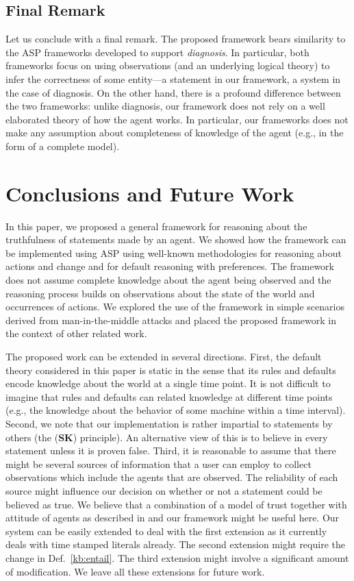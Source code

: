 \documentclass{article}
\begin{document}

\subsection{Final Remark}
Let us conclude with a final remark. 
 The proposed framework bears  similarity  to the ASP frameworks developed to
 support \emph{diagnosis}. In particular, both frameworks  focus on using observations (and an underlying logical theory) to infer the correctness of some entity---a statement in our framework, a system in the case of diagnosis. 
 On the other hand, there is a profound difference between the two frameworks: unlike diagnosis, our 
 framework does  not rely on  a well elaborated theory of how the agent works. In particular, our frameworks 
 does not make any assumption about completeness of knowledge of the agent (e.g., in the form of a complete
 model).
  \fi 
   
 \section{Conclusions and Future Work}
In this paper, we proposed a general framework for reasoning about the truthfulness of statements
made by an agent. We showed how the framework can be implemented using ASP using well-known methodologies for reasoning about actions and change and for default reasoning with preferences. The framework does not assume complete knowledge about the agent being observed and the reasoning 
process builds on observations about the state of the world and occurrences of actions. We explored the use of the
framework in simple scenarios derived from man-in-the-middle attacks and  placed the proposed framework in the context of other related work.


The proposed work can be extended in several directions. First, the default theory considered in this paper is static in the sense that its rules and defaults encode knowledge about the world at a single time point. It is not difficult to imagine that rules and defaults can related knowledge at different time points (e.g., the knowledge about the behavior of some machine within a time interval). 
Second, we note that our implementation is rather impartial to statements by others (the ({\bf SK}) principle). An alternative view of this is to believe in every statement unless it is proven false. Third, it is reasonable to assume that there might be several sources of information that a user can employ to collect observations which include the agents that are observed. The reliability of each source might influence our decision on whether or not a statement could be believed as true. We believe that a combination of a model of trust together with attitude of agents as described in \cite{SabaterS05,ArtzG07} and our framework might be useful here. 
Our  system can be easily extended to deal with the first extension 
as it currently deals with time stamped literals already. The second extension might require the change in Def.~\ref{kb:entail}. The third extension might involve a significant amount of modification. We leave all these extensions for future work.  
\end{document}
